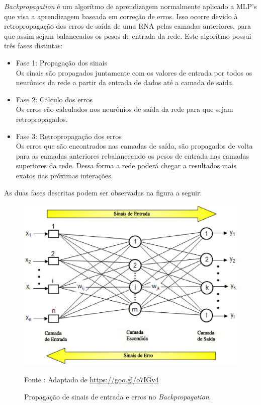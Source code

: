 \textit{Backpropagation} é um algorítmo de aprendizagem normalmente aplicado a MLP's que visa a aprendizagem baseada em correção de erros. Isso ocorre devido à retropropagação dos erros de saída de uma RNA pelas camadas anteriores, para que assim sejam balanceados os pesos de entrada da rede.
Este algorítmo possui três fases distintas:

\begin{itemize}
    \item Fase 1: Propagação dos sinais \\ Os sinais são propagados juntamente com os valores de entrada por todos os neurônios da rede a partir da entrada de dados até a camada de saída.
    \item Fase 2: Cálculo dos erros \\ Os erros são calculados nos neurônios de saída da rede para que sejam retropropagados.
    \item Fase 3: Retropropagação dos erros \\ Os erros que são encontrados nas camadas de saída, são propagados de volta para as camadas anteriores rebalanceando os pesos de entrada nas camadas superiores da rede. \cite{netto2006} Dessa forma a rede poderá chegar a resultados mais exatos nas próximas interações.
\end{itemize}

As duas fases descritas podem ser observadas na figura a seguir:

\begin{figure}[ht]
        \centering
        \label{fig05}
            \includegraphics[keepaspectratio=true, scale=0.4]{editaveis/images/backprop.eps}
        \caption{Propagação de sinais de entrada e erros no \textit{Backpropagation}.}
        Fonte : Adaptado de \url{https://goo.gl/o7IGy4}
\end{figure}

